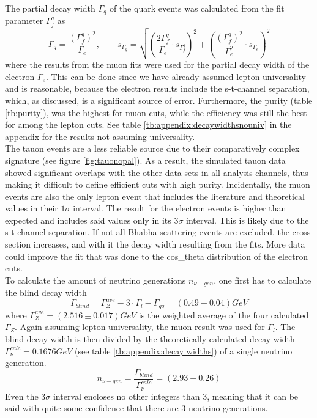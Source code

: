 The partial decay width $\Gamma_q$ of the quark events was calculated from the fit parameter $\Gamma_f^q$ as
\begin{equation}
\Gamma_q=\frac{(\Gamma_{f}^q)^2}{\Gamma_e},\qquad
s_{\Gamma_q}=\sqrt{\left(\frac{2\Gamma_f^q}{\Gamma_e}\cdot s_{\Gamma_f^q}\right)^2+\left(\frac{(\Gamma_f^q)^2}{\Gamma_e^2}\cdot s_{\Gamma_e}\right)^2}
\end{equation}
where the results from the muon fits were used for the partial decay width of the electron $\Gamma_e$. This can be done since we have already assumed lepton universality and is reasonable, because the electron results include the s-t-channel separation, which, as discussed, is a significant source of error. Furthermore, the purity (table \ref{tb:purity}), was the highest for muon cuts, while the efficiency was still the best for among the lepton cuts. See table \ref{tb:appendix:decaywidthsnouniv} in the appendix for the results not assuming universality.\\
The tauon events are a less reliable source due to their comparatively complex signature (see figure \ref{fig:tauonopal}). As a result, the simulated tauon data showed significant overlaps with the other data sets in all analysis channels, thus making it difficult to define efficient cuts with high purity. 
Incidentally, the muon events are also the only lepton event that includes the literature and theoretical values in their $1\sigma$ interval. The result for the electron events is higher than expected and includes said values only in its $3\sigma$ interval. This is likely due to the s-t-channel separation. If not all Bhabha scattering events are excluded, the cross section increases, and with it the decay width resulting from the fits. More data could improve the fit that was done to the cos\_theta distribution of the electron cuts. \\

To calculate the amount of neutrino generations $n_{\nu-gen}$, one first has to calculate the blind decay width
\begin{equation}
	\Gamma_{blind}=\Gamma_{Z}^{ave}-3\cdot\Gamma_l-\Gamma_{q\overline{q}}=\unit{(0.49\pm0.04)}{GeV}
\end{equation}
where $\Gamma_{Z}^{ave}=\unit{(2.516\pm0.017)}{GeV}$ is the weighted average of the four calculated $\Gamma_Z$. Again assuming lepton universality, the muon result was used for $\Gamma_l$.
The blind decay width is then divided by the theoretically calculated decay width $\Gamma_{\nu}^{calc}=\unit{0.1676}{GeV}$ (see table \ref{tb:appendix:decay widths}) of a single neutrino generation.
\begin{equation}
	n_{\nu-gen}=\frac{\Gamma_{blind}}{\Gamma_{\nu}^{calc}}=(2.93\pm0.26)
\end{equation}
Even the $3\sigma$ interval encloses no other integers than 3, meaning that it can be said with quite some confidence that there are 3 neutrino generations.


